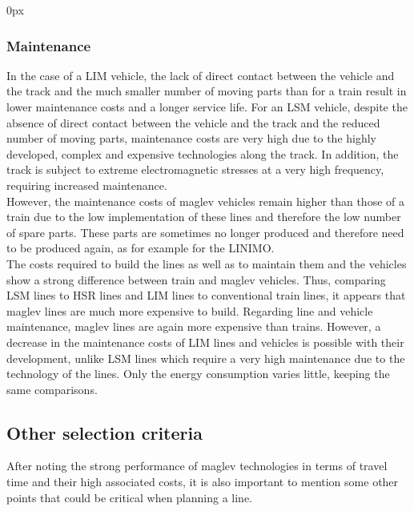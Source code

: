 \documentclass[12pt, a4paper, onecolumn]{article}
\renewcommand{\tab}{\tabto{15px}}
\begin{document}
\pagebreak %
\begin{addmargin}[30px]{0px} \subsubsection*{Maintenance}\end{addmargin}

\tab In the case of a LIM vehicle, the lack of direct contact between the vehicle and the track and the much smaller number of moving parts than for a train result in lower maintenance costs and a longer service life.
For an LSM vehicle, despite the absence of direct contact between the vehicle and the track and the reduced number of moving parts, maintenance costs are very high due to the highly developed, complex and expensive technologies along the track.
In addition, the track is subject to extreme electromagnetic stresses at a very high frequency, requiring increased maintenance. \\
\linebreak
\tab However, the maintenance costs of maglev vehicles remain higher than those of a train due to the low implementation of these lines and therefore the low number of spare parts.
These parts are sometimes no longer produced and therefore need to be produced again, as for example for the LINIMO. \\
\linebreak
\linebreak
\tab The costs required to build the lines as well as to maintain them and the vehicles show a strong difference between train and maglev vehicles.
Thus, comparing LSM lines to HSR lines and LIM lines to conventional train lines, it appears that maglev lines are much more expensive to build.
Regarding line and vehicle maintenance, maglev lines are again more expensive than trains.
However, a decrease in the maintenance costs of LIM lines and vehicles is possible with their development, unlike LSM lines which require a very high maintenance due to the technology of the lines.
Only the energy consumption varies little, keeping the same comparisons.




\pagebreak %
\subsection{Other selection criteria}
\tab After noting the strong performance of maglev technologies in terms of travel time and their high associated costs, it is also important to mention some other points that could be critical when planning a line.
\end{document}

